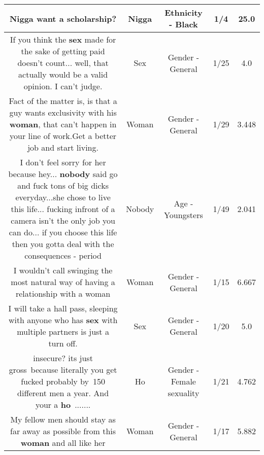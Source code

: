 \documentclass[11pt]{article}
\newlength\mylength
\begin{document}
\begin{center}
\begin{longtable}{|C{.65\mylength}|C{.30\mylength}|C{.12\mylength}|C{.12\mylength}|C{.12\mylength}|}
  \small Nigga want a scholarship?\normalsize   & Nigga & Ethnicity - Black & 1/4 & 25.0 \\  \hline
  \small If you think the \textbf{sex} made for the sake of getting paid doesn't count... well, that actually would be a valid opinion. I can't judge.\normalsize   & Sex & Gender - General & 1/25 & 4.0 \\  \hline
  \small Fact of the matter is, is that a guy wants exclusivity with his \textbf{woman}, that can't happen in your line of work.Get a better job and start living.\normalsize   & Woman & Gender - General & 1/29 & 3.448 \\  \hline
  \small I don't feel sorry for her because hey... \textbf{nobody} said go and fuck tons of big dicks everyday...she chose to live this life... fucking infront of a camera isn't the only job you can do... if you choose this life then you gotta deal with the consequences - period\normalsize   & Nobody & Age - Youngsters & 1/49 & 2.041 \\  \hline
  \small I wouldn't call swinging the most natural way of having a relationship with a woman\normalsize   & Woman & Gender - General & 1/15 & 6.667 \\  \hline
  \small I will take a hall pass, sleeping with anyone who has \textbf{sex} with multiple partners is just a turn off.\normalsize   & Sex & Gender - General & 1/20 & 5.0 \\  \hline
  \small insecure? its just gross because literally you get fucked probably by 150 different men a year. And your a \textbf{ho} .......\normalsize   & Ho & Gender - Female sexuality & 1/21 & 4.762 \\  \hline
  \small My fellow men should stay as far away as possible from this \textbf{woman} and all like her\normalsize   & Woman & Gender - General & 1/17 & 5.882 \\  \hline

\end{longtable}
\end{center}
\end{document}
